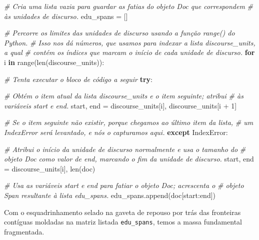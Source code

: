 \documentclass[
  brazilian,
]{article}
\newenvironment{Shaded}{}{}
\newcommand{\BuiltInTok}[1]{#1}
\newcommand{\CommentTok}[1]{\textcolor[rgb]{0.38,0.63,0.69}{\textit{#1}}}
\newcommand{\ControlFlowTok}[1]{\textcolor[rgb]{0.00,0.44,0.13}{\textbf{#1}}}
\newcommand{\DecValTok}[1]{\textcolor[rgb]{0.25,0.63,0.44}{#1}}
\newcommand{\KeywordTok}[1]{\textcolor[rgb]{0.00,0.44,0.13}{\textbf{#1}}}
\newcommand{\NormalTok}[1]{#1}
\newcommand{\OperatorTok}[1]{\textcolor[rgb]{0.40,0.40,0.40}{#1}}
\newcommand{\PreprocessorTok}[1]{\textcolor[rgb]{0.74,0.48,0.00}{#1}}
\begin{document}
\begin{Shaded}
\begin{Highlighting}[]
\CommentTok{\# Cria uma lista vazia para guardar as fatias do objeto Doc que correspondem}
\CommentTok{\# às unidades de discurso.}
\NormalTok{edu\_spans }\OperatorTok{=}\NormalTok{ []}

\CommentTok{\# Percorre os limites das unidades de discurso usando a função range() do Python.}
\CommentTok{\# Isso nos dá números, que usamos para indexar a lista \textquotesingle{}discourse\_units\textquotesingle{}, a qual}
\CommentTok{\# contém os índices que marcam o início de cada unidade de discurso.}
\ControlFlowTok{for}\NormalTok{ i }\KeywordTok{in} \BuiltInTok{range}\NormalTok{(}\BuiltInTok{len}\NormalTok{(discourse\_units)):}
    
    \CommentTok{\# Tenta executar o bloco de código a seguir}
    \ControlFlowTok{try}\NormalTok{:}
        
        \CommentTok{\# Obtém o item atual da lista \textquotesingle{}discourse\_units\textquotesingle{} e o item seguinte; atribui}
        \CommentTok{\# às variáveis \textquotesingle{}start\textquotesingle{} e \textquotesingle{}end\textquotesingle{}.}
\NormalTok{        start, end }\OperatorTok{=}\NormalTok{ discourse\_units[i], discourse\_units[i }\OperatorTok{+} \DecValTok{1}\NormalTok{]}
    
    \CommentTok{\# Se o item seguinte não existir, porque chegamos ao último item da lista,}
    \CommentTok{\# um IndexError será levantado, e nós o capturamos aqui.}
    \ControlFlowTok{except} \PreprocessorTok{IndexError}\NormalTok{:}
        
        \CommentTok{\# Atribui o início da unidade de discurso normalmente e usa o tamanho do}
        \CommentTok{\# objeto Doc como valor de \textquotesingle{}end\textquotesingle{}, marcando o fim da unidade de discurso.}
\NormalTok{        start, end }\OperatorTok{=}\NormalTok{ discourse\_units[i], }\BuiltInTok{len}\NormalTok{(doc)}

    \CommentTok{\# Usa as variáveis \textquotesingle{}start\textquotesingle{} e \textquotesingle{}end\textquotesingle{} para fatiar o objeto Doc; acrescenta o}
    \CommentTok{\# objeto Span resultante à lista \textquotesingle{}edu\_spans\textquotesingle{}.}
\NormalTok{    edu\_spans.append(doc[start:end])}
\end{Highlighting}
\end{Shaded}

Com o esquadrinhamento selado na gaveta de repouso por trás das
fronteiras contíguas moldadas na matriz listada \texttt{edu\_spans},
temos a massa fundamental fragmentada.
\end{document}
